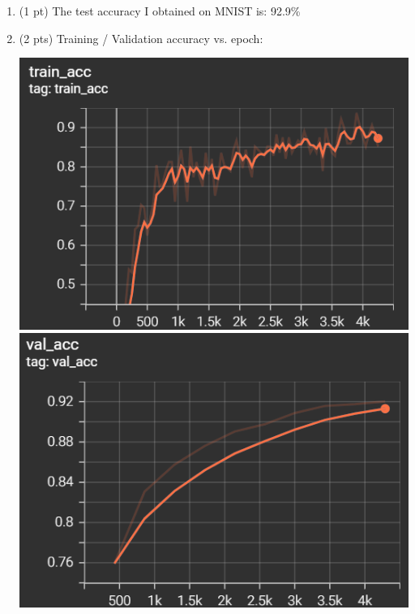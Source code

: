 \documentclass[10pt]{article}
\begin{document}
\begin{exercise}
\begin{enumerate}
		\item (1 pt) The test accuracy I obtained on MNIST is: 92.9\%

		\item (2 pts) Training / Validation accuracy  vs. epoch:

		      \includegraphics[width=.45\textwidth]{img/train_acc.png}
		      \includegraphics[width=.45\textwidth]{img/val_acc.png}
	\end{enumerate}
\end{exercise}

\newpage
\end{document}
